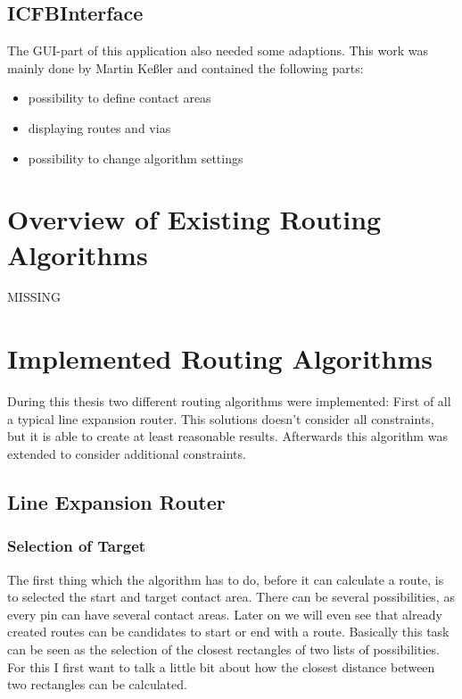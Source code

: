 \subsection{ICFBInterface}
The GUI-part of this application also needed some adaptions. This work was mainly done by Martin Keßler and contained the following parts:

\begin{itemize}
\item possibility to define contact areas
\item displaying routes and vias
\item possibility to change algorithm settings
\end{itemize}	

\section{Overview of Existing Routing Algorithms}

MISSING

\section{Implemented Routing Algorithms}
During this thesis two different routing algorithms were implemented: First of all a typical line expansion router. This solutions doesn't consider all constraints, but it is able to create at least reasonable results. Afterwards this algorithm was extended to consider additional constraints.

\subsection{Line Expansion Router}

\subsubsection{Selection of Target}
The first thing which the algorithm has to do, before it can calculate a route, is to selected the start and target contact area. There can be several possibilities, as every pin can have several contact areas. Later on we will even see that already created routes can be candidates to start or end with a route. Basically this task can be seen as the selection of the closest rectangles of two lists of possibilities. For this I first want to talk a little bit about how the closest distance between two rectangles can be calculated.

